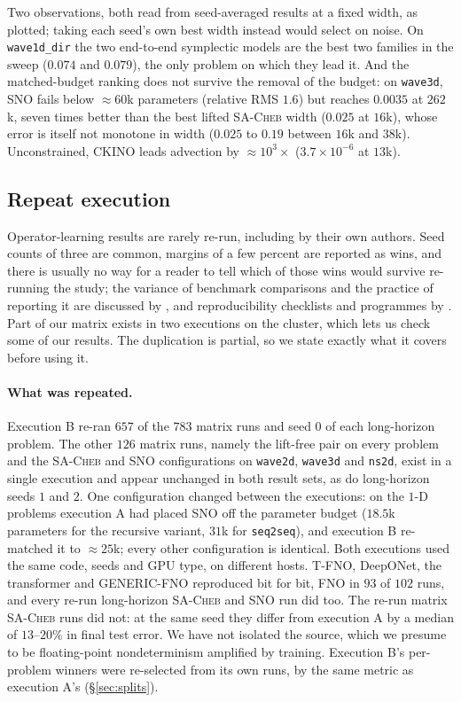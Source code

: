 \documentclass[11pt]{article}
\theoremstyle{definition}
\theoremstyle{remark}
\newcommand{\sacheb}{\textsc{SA-Cheb}}
\begin{document}
Two observations, both read from seed-averaged results at a fixed width, as
plotted; taking each seed's own best width instead would select on noise. On
\texttt{wave1d\_dir} the two end-to-end symplectic models are the best two
families in the sweep ($0.074$ and $0.079$), the only problem on which they
lead it. And the matched-budget ranking does not survive the removal of the
budget: on \texttt{wave3d}, SNO fails below $\approx60$k parameters (relative
RMS $1.6$) but reaches $0.0035$ at $262$k, seven times better than the best
lifted \sacheb{} width ($0.025$ at $16$k), whose error is itself not monotone in
width ($0.025$ to $0.19$ between $16$k and $38$k). Unconstrained, CKINO leads
advection by $\approx10^{3}\times$ ($3.7\times10^{-6}$ at $13$k).

\subsection{Repeat execution}
\label{sec:repro}

Operator-learning results are rarely re-run, including by their own authors.
Seed counts of three are common, margins of a few percent are reported as wins,
and there is usually no way for a reader to tell which of those wins would
survive re-running the study; the variance of benchmark comparisons and the
practice of reporting it are discussed by \citet{bouthillier2021variance}, and
reproducibility checklists and programmes by
\citet{pineau2021reproducibility}. Part of our matrix exists in two executions on
the cluster, which lets us check some of our results. The duplication is partial,
so we state exactly what it covers before using it.

\paragraph{What was repeated.} Execution B re-ran $657$ of the $783$ matrix
runs and seed $0$ of each long-horizon problem. The other $126$ matrix runs,
namely the lift-free pair on every problem and the \sacheb{} and SNO
configurations on \texttt{wave2d}, \texttt{wave3d} and \texttt{ns2d}, exist in a
single execution and appear unchanged in both result sets, as do long-horizon
seeds $1$ and $2$. One configuration changed between the executions: on the
$1$-D problems execution A had placed SNO off the parameter budget ($18.5$k
parameters for the recursive variant, $31$k for \texttt{seq2seq}), and execution
B re-matched it to $\approx25$k; every other configuration is identical. Both
executions used the same code, seeds and GPU type, on different hosts. T-FNO,
DeepONet, the transformer and GENERIC-FNO reproduced bit for bit, FNO in $93$ of
$102$ runs, and every re-run long-horizon \sacheb{} and SNO run did too. The
re-run matrix \sacheb{} runs did not: at the same seed they differ from
execution A by a median of $13$--$20\%$ in final test error. We have not
isolated the source, which we presume to be floating-point nondeterminism
amplified by training. Execution B's per-problem winners were re-selected from
its own runs, by the same metric as execution A's (\S\ref{sec:splits}).
\end{document}
